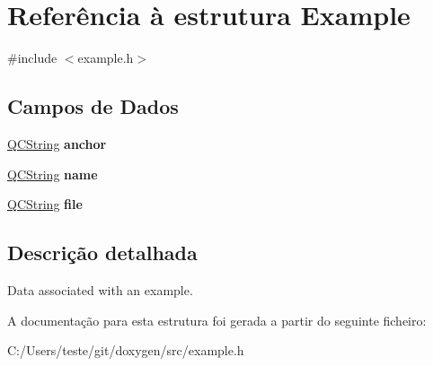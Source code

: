 \hypertarget{struct_example}{\section{Referência à estrutura Example}
\label{struct_example}
}


{\ttfamily \#include $<$example.\-h$>$}

\subsection*{Campos de Dados}
\begin{DoxyCompactItemize}
\item 
\hypertarget{struct_example_a77f4824b029885f469aa2903eabf92d4}{\hyperlink{class_q_c_string}{Q\-C\-String} {\bfseries anchor}}\label{struct_example_a77f4824b029885f469aa2903eabf92d4}

\item 
\hypertarget{struct_example_adc0097c7bd1e61ad32058fcde425bc7a}{\hyperlink{class_q_c_string}{Q\-C\-String} {\bfseries name}}\label{struct_example_adc0097c7bd1e61ad32058fcde425bc7a}

\item 
\hypertarget{struct_example_afeb3e9dc965e44d291bbce99ea8dbcc7}{\hyperlink{class_q_c_string}{Q\-C\-String} {\bfseries file}}\label{struct_example_afeb3e9dc965e44d291bbce99ea8dbcc7}

\end{DoxyCompactItemize}


\subsection{Descrição detalhada}
Data associated with an example. 

A documentação para esta estrutura foi gerada a partir do seguinte ficheiro\-:\begin{DoxyCompactItemize}
\item 
C\-:/\-Users/teste/git/doxygen/src/example.\-h\end{DoxyCompactItemize}
